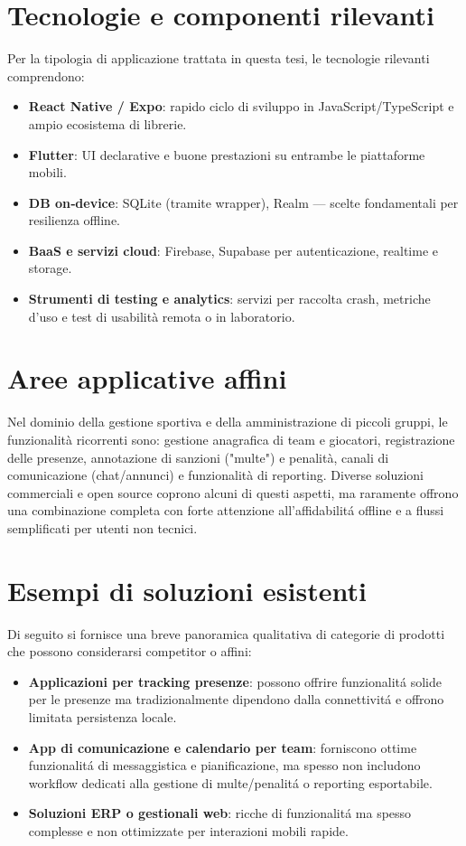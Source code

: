 \section{Tecnologie e componenti rilevanti}
Per la tipologia di applicazione trattata in questa tesi, le tecnologie rilevanti comprendono:
\begin{itemize}
  \item \textbf{React Native / Expo}: rapido ciclo di sviluppo in JavaScript/TypeScript e ampio ecosistema di librerie.
  \item \textbf{Flutter}: UI declarative e buone prestazioni su entrambe le piattaforme mobili.
  \item \textbf{DB on‑device}: SQLite (tramite wrapper), Realm — scelte fondamentali per resilienza offline.
  \item \textbf{BaaS e servizi cloud}: Firebase, Supabase per autenticazione, realtime e storage.
  \item \textbf{Strumenti di testing e analytics}: servizi per raccolta crash, metriche d'uso e test di usabilità remota o in laboratorio.
\end{itemize}

\section{Aree applicative affini}
Nel dominio della gestione sportiva e della amministrazione di piccoli gruppi, le funzionalità ricorrenti sono: gestione anagrafica di team e giocatori, registrazione delle presenze, annotazione di sanzioni ("multe") e penalità, canali di comunicazione (chat/annunci) e funzionalità di reporting. Diverse soluzioni commerciali e open source coprono alcuni di questi aspetti, ma raramente offrono una combinazione completa con forte attenzione all'affidabilit\'a offline e a flussi semplificati per utenti non tecnici.

\section{Esempi di soluzioni esistenti}
Di seguito si fornisce una breve panoramica qualitativa di categorie di prodotti che possono considerarsi competitor o affini:

\begin{itemize}
  \item \textbf{Applicazioni per tracking presenze}: possono offrire funzionalit\'a solide per le presenze ma tradizionalmente dipendono dalla connettivit\'a e offrono limitata persistenza locale.
  \item \textbf{App di comunicazione e calendario per team}: forniscono ottime funzionalit\'a di messaggistica e pianificazione, ma spesso non includono workflow dedicati alla gestione di multe/penalit\'a o reporting esportabile.
  \item \textbf{Soluzioni ERP o gestionali web}: ricche di funzionalit\'a ma spesso complesse e non ottimizzate per interazioni mobili rapide.
\end{itemize}

